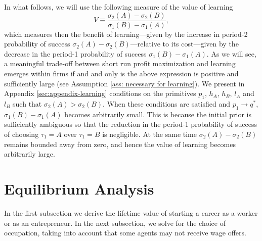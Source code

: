 \documentclass[12pt,american]{paper}
\theoremstyle{remark}
\begin{document}
In what follows, we will use the following measure of the value of learning
\[
V \equiv \frac{\sigma_2(A)-\sigma_2(B)}{\sigma_1(B)-\sigma_1(A)},
\]
which measures then the benefit of learning---given by the increase in period-2 probability of success $\sigma_2(A)-\sigma_2(B)$---relative to its cost---given by the decrease in the period-1 probability of success $\sigma_1(B)-\sigma_1(A)$. As we will see, a meaningful trade-off between short run profit maximization and learning emerges within firms if and and only is the above expression is positive and sufficiently large (see Assumption \ref{ass: necessary for learning}). We present in Appendix  \ref{sec:appendix-learning}  conditions on the primitives $p_1$, $h_A$, $h_B$, $l_A$ and $l_B$ such that $\sigma_2(A)>\sigma_2(B)$. When these conditions are satisfied and $p_1\rightarrow q^*$,  $\sigma_1(B)-\sigma_1(A)$ becomes arbitrarily small. This is because the initial prior is sufficiently ambiguous so that the reduction in the period-1 probability of success of choosing $\tau_1=A$ over $\tau_1=B$ is negligible. At the same time $\sigma_2(A)-\sigma_2(B)$ remains bounded away from zero, and hence the value of learning becomes arbitrarily large.














\section{Equilibrium Analysis}\label{sec:equilibrium}
In the first subsection we derive the lifetime value of starting a career as a worker or as an entrepreneur.  In the next subsection, we solve for the choice of occupation, taking into account that some agents may not receive wage offers.
\end{document}
